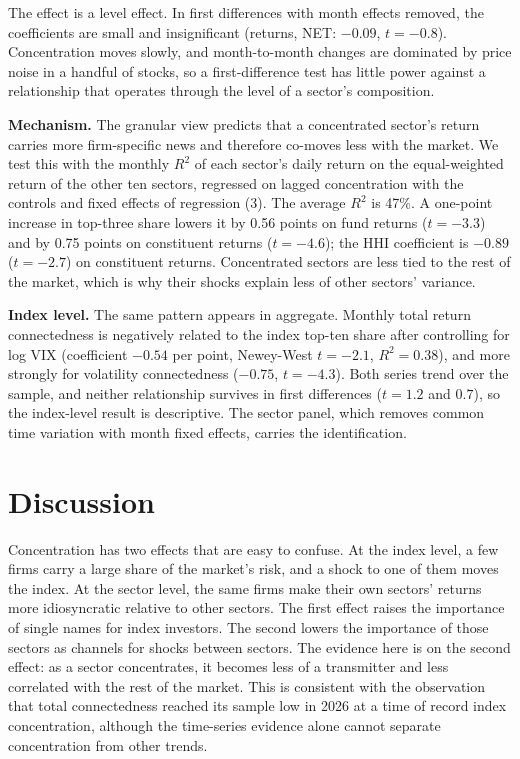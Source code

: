 \documentclass[11pt]{article}
\begin{document}
The effect is a level effect. In first differences with month effects removed, the coefficients are small and insignificant (returns, NET: $-0.09$, $t=-0.8$). Concentration moves slowly, and month-to-month changes are dominated by price noise in a handful of stocks, so a first-difference test has little power against a relationship that operates through the level of a sector's composition.

\textbf{Mechanism.} The granular view predicts that a concentrated sector's return carries more firm-specific news and therefore co-moves less with the market. We test this with the monthly $R^2$ of each sector's daily return on the equal-weighted return of the other ten sectors, regressed on lagged concentration with the controls and fixed effects of regression (3). The average $R^2$ is 47\%. A one-point increase in top-three share lowers it by 0.56 points on fund returns ($t=-3.3$) and by 0.75 points on constituent returns ($t=-4.6$); the HHI coefficient is $-0.89$ ($t=-2.7$) on constituent returns. Concentrated sectors are less tied to the rest of the market, which is why their shocks explain less of other sectors' variance.

\textbf{Index level.} The same pattern appears in aggregate. Monthly total return connectedness is negatively related to the index top-ten share after controlling for log VIX (coefficient $-0.54$ per point, Newey-West $t=-2.1$, $R^2=0.38$), and more strongly for volatility connectedness ($-0.75$, $t=-4.3$). Both series trend over the sample, and neither relationship survives in first differences ($t=1.2$ and $0.7$), so the index-level result is descriptive. The sector panel, which removes common time variation with month fixed effects, carries the identification.

\section{Discussion}\label{sec:disc}

Concentration has two effects that are easy to confuse. At the index level, a few firms carry a large share of the market's risk, and a shock to one of them moves the index. At the sector level, the same firms make their own sectors' returns more idiosyncratic relative to other sectors. The first effect raises the importance of single names for index investors. The second lowers the importance of those sectors as channels for shocks between sectors. The evidence here is on the second effect: as a sector concentrates, it becomes less of a transmitter and less correlated with the rest of the market. This is consistent with the observation that total connectedness reached its sample low in 2026 at a time of record index concentration, although the time-series evidence alone cannot separate concentration from other trends.
\end{document}
